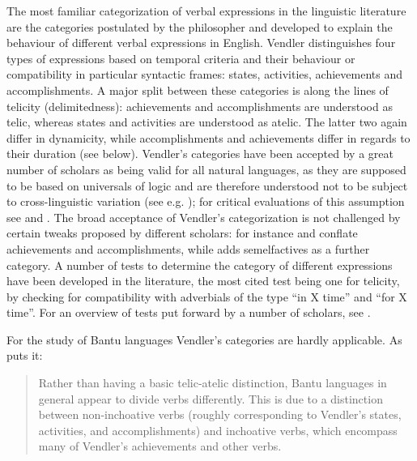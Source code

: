 The most familiar categorization of verbal expressions in the linguistic literature are the categories postulated by the philosopher \citet{VendlerZ1957} and developed to explain the behaviour of different verbal expressions in English. Vendler distinguishes four types of expressions based on temporal criteria and their behaviour or compatibility in particular syntactic frames: states, activities, achievements and accomplishments. A major split between these categories is along the lines of telicity (delimitedness): achievements and accomplishments are understood as telic, whereas states and activities are understood as atelic. The latter two again differ in dynamicity, while accomplishments and achievements differ in regards to their duration (see below). Vendler's categories have been accepted by a great number of scholars as being valid for all natural languages, as they are supposed to be based on universals of logic and are therefore understood not to be subject to cross-linguistic variation (see e.g. \citealt[322]{TatevosovS2002}); for critical evaluations of this assumption see \citet{FilipH2011} and \citet{Bar-elL2015}. The broad acceptance of Vendler's categorization is not challenged by certain tweaks proposed by different scholars: for instance \citet{VerkuylH1972} and \citet{KennyA1969} conflate achievements and accomplishments, while \citet{SmithC1997} adds semelfactives as a further category. A number of tests to determine the category of different expressions have been developed in the literature, the most cited test being one for telicity, by checking for compatibility with adverbials of the type ``in X time'' and ``for X time''. For an overview of tests put forward by a number of scholars, see \citet[173–197]{BinnickR1991}.

For the study of Bantu languages Vendler's categories are hardly applicable. As \citeauthor{CraneTM2011} puts it:
\begin{quote}Rather than having a basic telic-atelic distinction, Bantu languages in general appear to divide verbs differently. This is due to a distinction between non-inchoative verbs (roughly corresponding to Vendler’s states, activities, and accomplishments) and inchoative verbs, which encompass many of Vendler’s achievements and other verbs. \citep[34]{CraneTM2011}\end{quote}

